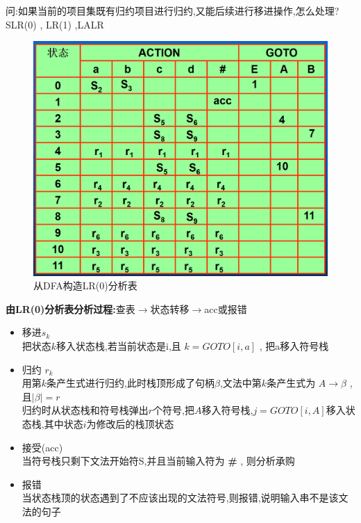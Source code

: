 \documentclass[UTF8,a4paper]{ctexart}
\newcommand{\spaceline}{\vspace{\baselineskip}}
\begin{document}
 问:如果当前的项目集既有归约项目进行归约,又能后续进行移进操作,怎么处理?SLR(0) , LR(1) ,LALR

 \begin{figure}[H]
  \centering
  \includegraphics[scale = 0.3]{assets/CompilerConstructionPrinciples_dfa7c.png}
  \caption{从DFA构造LR(0)分析表}
 \end{figure}

 \spaceline
 \textbf{由LR(0)分析表分析过程:}查表$\to$状态转移$\to$acc或报错

 \begin{itemize}
  \item 移进$s_k$\\
        把状态$k$移入状态栈,若当前状态是i,且 $k = GOTO[i,a]$ , 把a移入符号栈
  \item 归约 $r_k$\\
        用第$k$条产生式进行归约,此时栈顶形成了句柄$\beta$,文法中第$k$条产生式为
        $A \to \beta$ , 且$|\beta| = r$\\
        归约时从状态栈和符号栈弹出$r$个符号,把$A$移入符号栈,$j = GOTO[i,A]$移入状态栈,其中状态$i$为修改后的栈顶状态
  \item 接受(acc)\\
        当符号栈只剩下文法开始符S,并且当前输入符为 \textbf{\#} , 则分析承购
  \item 报错\\
        当状态栈顶的状态遇到了不应该出现的文法符号,则报错,说明输入串不是该文法的句子
 \end{itemize}
\end{document}
